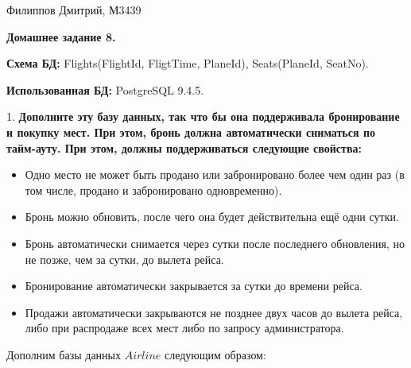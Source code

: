 \documentclass[11pt,a4paper,oneside]{article}
\begin{document}
\renewcommand{\t}[1]{\mbox{\texttt{#1}}}
\newcommand{\s}[1]{\mbox{``\t{#1}''}}
\newcommand{\eps}{\varepsilon}
\renewcommand{\phi}{\varphi}
\newcommand{\plainhat}{{\char 94}}

\newcommand{\Z}{\mathbb{Z}}
\newcommand{\w}[1]{``\t{#1}''}




Филиппов Дмитрий, М3439
\newline

\begin{LARGE} \textbf{Домашнее задание 8.} \end{LARGE}
\newline

\textbf{Схема БД:} Flights(FlightId, FligtTime, PlaneId), Seats(PlaneId, SeatNo).

\textbf{Использованная БД:} PostgreSQL 9.4.5.
\newline

1. \textbf{Дополните эту базу данных, так что бы она поддерживала бронирование и покупку мест. При этом, бронь должна автоматически сниматься по тайм-ауту. При этом, должны поддерживаться следующие свойства:}
\begin{itemize}
\item Одно место не может быть продано или забронировано более чем один раз (в том числе, продано и забронировано одновременно).
\item Бронь можно обновить, после чего она будет действительна ещё одни сутки.
\item Бронь автоматически снимается через сутки после последнего обновления, но не позже, чем за сутки, до вылета рейса.
\item Бронирование автоматически закрывается за сутки до времени рейса.
\item Продажи автоматически закрываются не позднее двух часов до вылета рейса, либо при распродаже всех мест либо по запросу администратора.
\end{itemize}

Дополним базы данных $Airline$ следующим образом:
\end{document}
